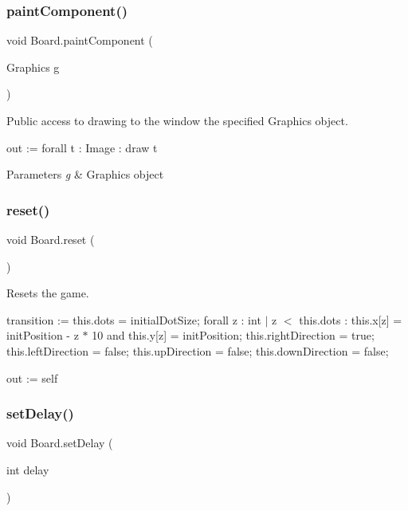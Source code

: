\subsubsection{\texorpdfstring{paint\+Component()}{paintComponent()}}
{\footnotesize\ttfamily void Board.\+paint\+Component (\begin{DoxyParamCaption}\item[{Graphics}]{g }\end{DoxyParamCaption})}

Public access to drawing to the window the specified Graphics object.

out \+:= forall t \+: Image \+: draw t


\begin{DoxyParams}{Parameters}
{\em g} & Graphics object \\
\hline
\end{DoxyParams}
\mbox{\label{class_board_a510b3c25a75fbfdc3a2d4bd0660cf958}} 
\subsubsection{\texorpdfstring{reset()}{reset()}}
{\footnotesize\ttfamily void Board.\+reset (\begin{DoxyParamCaption}{ }\end{DoxyParamCaption})}

Resets the game.

transition \+:= this.\+dots = initial\+Dot\+Size; forall z \+: int $\vert$ z $<$ this.\+dots \+: this.\+x\mbox{[}z\mbox{]} = init\+Position -\/ z $\ast$ 10 and this.\+y\mbox{[}z\mbox{]} = init\+Position; this.\+right\+Direction = true; this.\+left\+Direction = false; this.\+up\+Direction = false; this.\+down\+Direction = false;

out \+:= self \mbox{\label{class_board_aa3a8c18495cd2acb36b6227a008861a0}} 
\subsubsection{\texorpdfstring{set\+Delay()}{setDelay()}}
{\footnotesize\ttfamily void Board.\+set\+Delay (\begin{DoxyParamCaption}\item[{int}]{delay }\end{DoxyParamCaption})}

